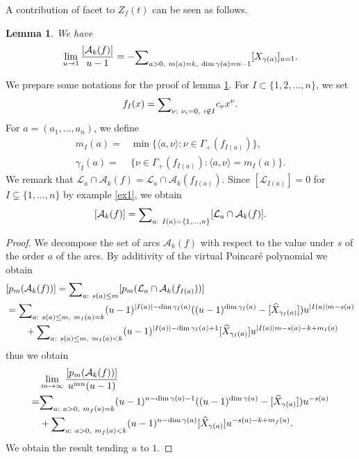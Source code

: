 \documentclass[12pt,a4paper,leqno]{amsart}
\newtheorem{lem}[thm]{Lemma}
\theoremstyle{definition}
\begin{document}
A contribution of facet to $Z_f(t)$ can be seen as follows. 
\begin{lem}\label{lemfacet}
We have 
$$
\lim_{u\to1}
\frac{[\mathcal A_k(f)]}{u-1}=-{\mathop{\textrm{\scriptsize $\mathop\sum$}}}_{a>0, ~m(a)=k, \ \dim\gamma(a)=n-1}[X_{\gamma(a)}]_{u=1}. 
$$
\end{lem}
We prepare some notations for the proof of lemma \ref{lemfacet}.
For $I\subset\{1,2,\dots,n\}$, 
we set 
$$
f_I(x)={\mathop{\textrm{\scriptsize $\mathop\sum$}}}_{\nu:~\nu_i=0, \ i\not\in I}c_\nu x^\nu .
$$
For $a=(a_1,\dots,a_n)$, 
we define 
\begin{align*}
m_I(a)=&\min\{\langle a,\nu\rangle :\nu\in\Gamma_+(f_{I(a)})\},\\
\gamma_I(a)=&\{\nu\in\Gamma_+(f_{I(a)}):\langle a,\nu\rangle=m_I(a)\}.
\end{align*}
We remark that $\mathcal L_a\cap\mathcal A_k(f)=
\mathcal L_a\cap\mathcal A_k(f_{I(a)})$. 
Since $[\mathcal L_{I(a)}]=0$ for $I\subsetneq \{1,\dots,n\}$ by
example \ref{ex1}, 
we obtain
$$
[\mathcal A_k(f)]={\mathop{\textrm{\scriptsize $\mathop\sum$}}}_{a:~I(a)=\{1,\dots,n\}}
[\mathcal L_a\cap\mathcal A_k(f)]. 
$$
\begin{proof}
We decompose the set of arcs $\mathcal A_k(f)$ with respect to the
value under $s$ of the order $a$ of the arcs. By additivity of the
virtual Poincar\'e polynomial we obtain
\begin{align*}
&[p_m(\mathcal A_k(f))]=
{\mathop{\textrm{\scriptsize $\mathop\sum$}}}_{a:~s(a)\le m}
[p_m(\mathcal L_a\cap\mathcal A_k(f_{I(a)}))]
\\
&=
{\mathop{\textrm{\scriptsize $\mathop\sum$}}}_{a:~s(a)\le m,~m_I(a)=k}
(u-1)^{|I(a)|-\dim\gamma_I(a)}((u-1)^{\dim\gamma_I(a)}
-[\widehat{X}_{\gamma_I(a)}])u^{|I(a)|m-s(a)}\\
&\qquad+
{\mathop{\textrm{\scriptsize $\mathop\sum$}}}_{a:~s(a)\le m,~m_I(a)<k}
(u-1)^{|I(a)|-\dim\gamma_I(a)+1}
[\widehat{X}_{\gamma_I(a)}]u^{|I(a)|m-s(a)-k+m_I(a)}
\end{align*}
thus we obtain 
\begin{align*}
&\lim_{m\to\infty}
\frac{[p_m(\mathcal A_k(f))]}{u^{mn}(u-1)}
\\
=&
{\mathop{\textrm{\scriptsize $\mathop\sum$}}}_{a:~a>0,~m_f(a)=k}
(u-1)^{n-\dim\gamma(a)-1}((u-1)^{\dim\gamma(a)}
-[\widehat{X}_{\gamma(a)}])u^{-s(a)}\\
&+
{\mathop{\textrm{\scriptsize $\mathop\sum$}}}_{a:~a>0,~m_f(a)<k}
(u-1)^{n-\dim\gamma(a)}
[\widehat{X}_{\gamma(a)}]u^{-s(a)-k+m_f(a)}.
\end{align*}
We obtain the result tending $u$ to $1$. 
\end{proof}
\end{document}

